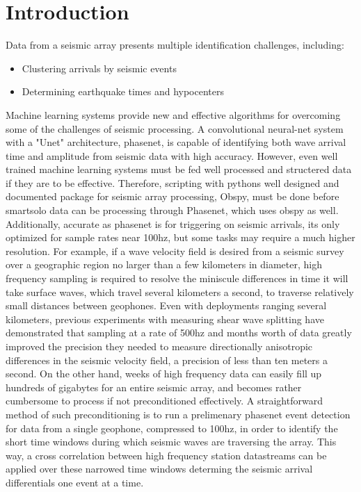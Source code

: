 \section{Introduction}
Data from a seismic array presents multiple identification challenges, including:
\begin{itemize}    
    \subitem b) Detecting seismic arrival events for the whole array
    \subitem c) Through greater precision, detecting differences in arrival time between geophones 
    \subitem a) Determining direction of wave displacement 
    \subitem c) Detecting seismic arrival amplitudes
    \subitem d) Determining the type of waves arriving
    \item Clustering arrivals by seismic events 
    \item Determining earthquake times and  hypocenters
\end{itemize}

Machine learning systems provide new and effective algorithms
for overcoming some of the challenges of seismic processing. A convolutional neural-net system
with a "Unet" architecture, phasenet, is capable of identifying both wave arrival time and amplitude from seismic data with high accuracy. 
However, even well trained machine learning systems must be fed well processed and structered data if they are to be effective. 
Therefore, scripting with pythons well designed and documented package for seismic array processing, Obspy, must be done before smartsolo data can be
processing through Phasenet, which uses obspy as well. Additionally, accurate as phasenet is for triggering on seismic arrivals, 
its only optimized for sample rates near 100hz, but some tasks may require a much higher resolution. For example, if a wave velocity field is desired 
from a seismic survey over a geographic region no larger than a few kilometers in diameter, high frequency sampling is required 
 to resolve the miniscule differences in time it will take surface waves, which travel several kilometers a second, to traverse relatively small distances between geophones. 
Even with deployments ranging several kilometers, previous experiments with measuring shear wave splitting have demonstrated that sampling at a rate of 500hz and months worth of data greatly improved 
the precision they needed to measure directionally anisotropic differences in the seismic velocity field,  a precision of less than ten meters a second.
On the other hand, weeks of high frequency data can easily fill up hundreds of gigabytes for an entire seismic array, and becomes rather cumbersome to process if not preconditioned effectively. 
A straightforward method of such preconditioning is to run a prelimenary phasenet event detection for data from a single geophone, compressed to 100hz, in order to identify the short time windows during which 
seismic waves are traversing the array. This way, a cross correlation between high frequency station datastreams can be applied over these narrowed time windows determing the seismic arrival differentials one event at a time. 
 

